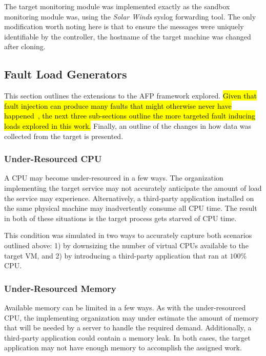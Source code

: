 The target monitoring module was implemented exactly as the sandbox monitoring
module was, using the \emph{Solar Winds} syslog forwarding tool.  The only
modification worth noting here is that to ensure the messages were uniquely
identifiable by the controller, the hostname of the target machine was changed
after cloning.

\setcounter{secnumdepth}{3}

\subsection{Fault Load Generators} \label{sec:extensions}
This section outlines the extensions to the \ac{AFP} framework explored.
\hl{Given that fault injection can produce many faults that might otherwise
never have happened~\citep{kikuchi2014}, the next three sub-sections outline
the more targeted fault inducing loads explored in this work.}  Finally, an
outline of the changes in how data was collected from the target is presented.

\subsubsection{Under-Resourced \ac{CPU}} \label{sec:extUnderResourcedCPU}
A \ac{CPU} may become under-resourced in a few ways.  The organization
implementing the target service may not accurately anticipate the amount of
load the service may experience.  Alternatively, a third-party application
installed on the same physical machine may inadvertently consume all \ac{CPU}
time.  The result in both of these situations is the target process gets
starved of \ac{CPU} time.

This condition was simulated in two ways to accurately capture both scenarios
outlined above:  1) by downsizing the number of virtual \ac{CPU}s available
to the target \ac{VM}, and 2) by introducing a third-party application that
ran at $100\%$ \ac{CPU}.

\subsubsection{Under-Resourced Memory} \label{sec:extUnderResourcedMem}
Available memory can be limited in a few ways.  As with the under-resourced
\ac{CPU}, the implementing organization may under estimate the amount of memory
that will be needed by a server to handle the required demand.  Additionally, a
third-party application could contain a memory leak.  In both cases, the target
application may not have enough memory to accomplish the assigned work.

